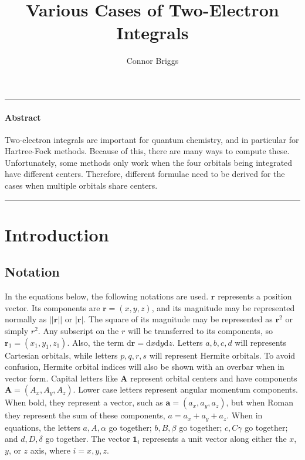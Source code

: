 \documentclass[twoside,10pt,draft]{article}
\begin{document}

\renewcommand\theequation{\thesection.\arabic{equation}}
\newcommand{\dvar}[1]{\ensuremath{\mathrm{d} #1}}
\newcommand{\dvarb}[1]{\ensuremath{\mathrm{d}\mathbf{#1}}}

\title{Various Cases of Two-Electron Integrals}
\author{Connor Briggs}
\maketitle

\hrule
\paragraph*{Abstract} Two-electron integrals are important for quantum chemistry, and in particular for Hartree-Fock methods. Because of this, there are many ways to compute these. Unfortunately, some methods only work when the four orbitals being integrated have different centers. Therefore, different formulae need to be derived for the cases when multiple orbitals share centers.\\
\hrule


\lhead[]{\thepage}
\rhead[\thepage]{}

\section{Introduction}

\subsection{Notation}

In the equations below, the following notations are used. $\mathbf{r}$ represents a position vector. Its components are $\mathbf{r} = (x, y, z)$, and its magnitude may be represented normally as $\left|\left|\mathbf{r}\right|\right|$ or $\left|\mathbf{r}\right|$. The square of its magnitude may be represented as $\mathbf{r}^2$ or simply $r^2$. Any subscript on the $r$ will be transferred to its components, so $\mathbf{r}_1 = \left(x_1, y_1, z_1\right)$. Also, the term $\dvarb{r} = \dvar{x}\dvar{y}\dvar{z}$. Letters $a, b, c, d$ will represents Cartesian orbitals, while letters $p, q, r, s$ will represent Hermite orbitals. To avoid confusion, Hermite orbital indices will also be shown with an overbar when in vector form. Capital letters like $\mathbf{A}$ represent orbital centers and have components $\mathbf{A} = \left(A_x, A_y, A_z\right)$. Lower case letters represent angular momentum components. When bold, they represent a vector, such as  $\mathbf{a} = \left(a_x, a_y, a_z\right)$, but when Roman they represent the sum of these components, $a = a_x + a_y + a_z$. When in equations, the letters $a, A, \alpha$ go together; $b, B, \beta$ go together; $c, C \gamma$ go together; and $d, D, \delta$ go together. The vector $\mathbf{1}_i$ represents a unit vector along either the $x$, $y$, or $z$ axis, where $i = x, y, z$.
\end{document}
